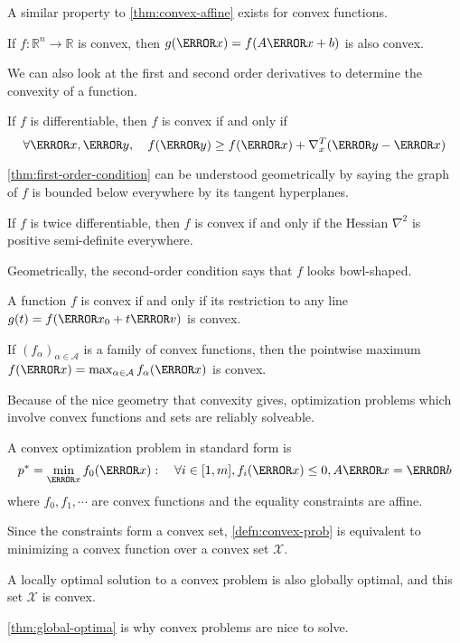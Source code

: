 A similar property to \cref{thm:convex-affine} exists for convex functions.
\begin{theorem}
	If $f:\mathbb{R}^n\to\mathbb{R}$ is convex, then $g(\V{x}) = f(A\V{x}+b)$ is also convex.
	\label{thm:convex-func-affine}
\end{theorem}
We can also look at the first and second order derivatives to determine the convexity of a function.
\begin{theorem}
	If $f$ is differentiable, then $f$ is convex if and only if \[
		\forall \V{x}, \V{y},\quad f(\V{y}) \geq f(\V{x}) + \nabla_x^T (\V{y}-\V{x})
	\]
	\label{thm:first-order-condition}
\end{theorem}
\cref{thm:first-order-condition} can be understood geometrically by saying the graph of $f$ is bounded below everywhere by its tangent hyperplanes.
\begin{theorem}
	If $f$ is twice differentiable, then $f$ is convex if and only if the Hessian $\nabla^2$ is positive semi-definite everywhere.
	\label{thm:second-order-condition}
\end{theorem}
Geometrically, the second-order condition says that $f$ looks bowl-shaped.
\begin{theorem}
	A function $f$ is convex if and only if its restriction to any line $g(t)=f(\V{x}_0+t\V{v})$ is convex.
	\label{thm:convex-func-line}
\end{theorem}
\begin{theorem}
	If $(f_\alpha)_{\alpha\in\mathcal{A}}$ is a family of convex functions, then the pointwise maximum $f(\V{x}) = \max_{\alpha\in\mathcal{A}} f_\alpha(\V{x})$ is convex.
	\label{thm:pointwise-max}
\end{theorem}
Because of the nice geometry that convexity gives, optimization problems which involve convex functions and sets are reliably solveable.
\begin{definition}
	A convex optimization problem in standard form is \[
		p^* = \min_{\V{x}}f_0(\V{x}) : \quad \forall i\in[1,m], f_i(\V{x}) \leq 0, A\V{x} = \V{b}
	\]
	where $f_0, f_1, \cdots$ are convex functions and the equality constraints are affine.
	\label{defn:convex-prob}
\end{definition}
Since the constraints form a convex set, \cref{defn:convex-prob} is equivalent to minimizing a convex function over a convex set $\mathcal{X}$.
\begin{theorem}
	A locally optimal solution to a convex problem is also globally optimal, and this set $\mathcal{X}$ is convex.
	\label{thm:global-optima}
\end{theorem}
\cref{thm:global-optima} is why convex problems are nice to solve.
